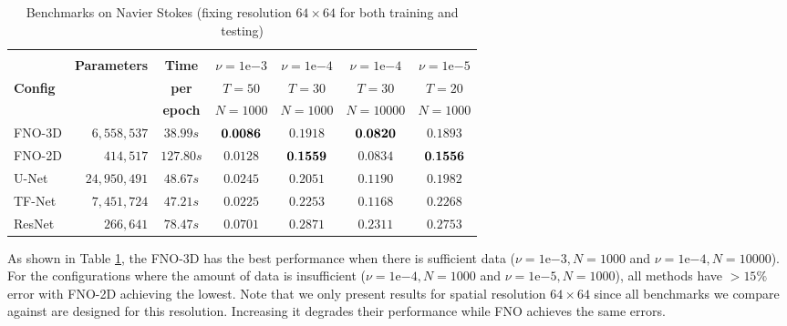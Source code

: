 \documentclass{article} %
\begin{document}
\begin{table}[h]
\caption{Benchmarks on Navier Stokes (fixing resolution $64 \times 64$ for both training and testing)}
\label{table:ns}
\begin{center}
\begin{tabular}{l|rc|cccc}
\multicolumn{1}{c}{} 
&\multicolumn{1}{c}{}
&\multicolumn{1}{c}{} 
&\multicolumn{1}{c}{} 
&\multicolumn{1}{c}{}\\
 & {\bf Parameters}& {\bf Time}& $\nu=1\mathrm{e}{-3}$ &$\nu=1\mathrm{e}{-4}$ &$\nu=1\mathrm{e}{-4}$ & $\nu=1\mathrm{e}{-5}$\\
 {\bf Config}&& {\bf per} &$T=50$ &$T=30$ &$T=30$ & $T=20$\\
 && {\bf epoch} &$ N=1000$ &$ N=1000$ &$N=10000$ & $ N=1000$\\
\hline 
FNO-3D    & $6,558,537$ & $38.99s$ &${\bf 0.0086}$ &$0.1918$ &${\bf 0.0820}$  &$0.1893$ \\
FNO-2D    & $414,517$ & $127.80s$ &$0.0128 $ &${\bf 0.1559}$ &$0.0834$  &${\bf 0.1556}$ \\
U-Net       & $24,950,491$ & $48.67s$ &$0.0245 $ &$0.2051$ &$0.1190$  &$0.1982$ \\
TF-Net       & $7,451,724$ & $47.21s$ &$0.0225 $ &$0.2253$ &$0.1168$  &$0.2268$ \\
ResNet     &$266,641$ & $78.47s$ &$0.0701 $ &$0.2871$ &$0.2311$  &$0.2753$ \\
\hline 
\end{tabular}
\end{center}
\end{table}

As shown in Table \ref{table:ns}, the FNO-3D has the best performance when there is sufficient data ($\nu=1\mathrm{e}{-3}, N=1000$ and $\nu=1\mathrm{e}{-4}, N=10000$). For the configurations where the amount of data is insufficient ($\nu=1\mathrm{e}{-4}, N=1000$ and $\nu=1\mathrm{e}{-5}, N=1000$), all methods have $>15\%$ error with FNO-2D achieving the lowest. Note that we only present results for spatial resolution $64 \times 64$ since all benchmarks we compare against are designed for this resolution. Increasing it degrades their performance while FNO achieves the same errors.  
\end{document}
